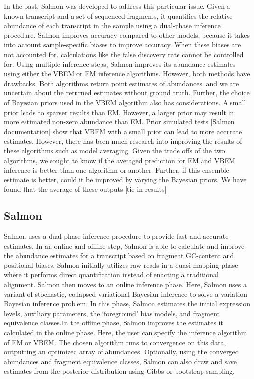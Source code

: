 In the past, Salmon was developed to address this particular issue. 
Given a known transcript and a set of sequenced fragments, it quantifies the relative abundance of each transcript in the sample using a dual-phase inference procedure. Salmon improves accuracy compared to other models, because it takes into account sample-specific biases to improve accuracy. When these biases are not accounted for, calculations like the false discovery rate cannot be controlled for. Using multiple inference steps, Salmon improves its abundance estimates using either the VBEM or EM inference algorithms. However, both methods have drawbacks. Both algorithms return point estimates of abundances, and we are uncertain about the returned estimates without ground truth. Further, the choice of  Bayesian priors used in the VBEM algorithm also has considerations. A small prior leads to sparser results than EM. However, a larger prior may result in more estimated non-zero abundance than EM. Prior simulated tests [Salmon documentation] show that VBEM with a small prior can lead to more accurate estimates. However, there has been much research into improving the results of these algorithms such as model averaging. \cite{doi:10.1177/2515245919898657}\cite{11c48783-68bb-36b7-8053-175211b0eaa8}\cite{hoeting_bayesian_1999} Given the trade offs of the two algorithms, we sought to know if the averaged prediction for EM and VBEM inference is better than one algorithm or another. Further, if this ensemble estimate is better, could it be improved by varying the Bayesian priors.
We have found that the average of these outputs [tie in results]

\subsection{Salmon}
Salmon uses a dual-phase inference procedure to provide fast and accurate estimates. 
In an online and offline step, Salmon is able to calculate and improve the abundance 
estimates for a transcript based on fragment GC-content and positional biases. 
Salmon initially utilizes raw reads in a quasi-mapping phase where it performs direct 
quantification instead of enacting a traditional alignment. 
Salmon then moves to an online inference phase. 
Here, Salmon uses a variant of stochastic, collapsed variational Bayesian inference to solve 
a variation Bayesian inference problem. 
In this phase, Salmon estimates the initial expression levels, auxiliary parameters, 
the ‘foreground’ bias models, and fragment equivalence classes.In the offline phase, 
Salmon improves the estimates it calculated in the online phase. Here, the user can 
specify the inference algorithm of EM or VBEM. The chosen algorithm runs to convergence 
on this data, outputting an optimized array of abundances. 
Optionally, using the converged abundances and fragment equivalence classes, 
Salmon can also draw and save estimates from the posterior distribution using Gibbs or bootstrap sampling. \cite{patro_salmon_2017}
